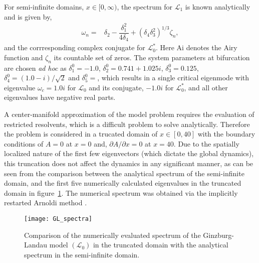 For semi-infinite domains, $x\in[0,\infty)$, the spectrum for $\mathcal{L}_{1}$ is known analytically \citep{chomaz88} and is given by,
	\begin{align}
		\omega_{n}	=& \delta_{2} - \dfrac{\delta_{1}^{2}}{4\delta_{4}} + (\delta_{4}\delta_{3}^{2})^{1/3}\zeta_{n}, \label{eqn:eigenvalues} 
	\end{align}
and the corrresponding complex conjugate for $\mathcal{L}^{*}_{0}$. Here $\mathrm{Ai}$ denotes the Airy function and $\zeta_{n}$ its countable set of zeros.
 The system parameters at bifurcation are chosen \emph{ad hoc} as $\delta^{0}_{1} = -1.0$, $\delta^{0}_{2} = 0.741 + 1.025i$, $\delta^{0}_{3}=0.125$, $\delta^{0}_{4}=(1.0 - i)/\sqrt{2}$ and $\delta^{0}_{5} = $, which results in a single critical eigenmode with eigenvalue $\omega_{c} = 1.0i$ for $\mathcal{L}_{0}$ and its conjugate, $-1.0i$ for $\mathcal{L}^{*}_{0}$, and all other eigenvalues have negative real parts. 
 
 A center-manifold approximation of the model problem requires the evaluation of restricted resolvents, which is a difficult problem to solve analytically. Therefore the problem is considered in a trucated domain of $x\in [0,40]$ with the boundary conditions of $A = 0$ at $x=0$ and, $\partial A/\partial x = 0$ at $x=40$. Due to the spatially localized nature of the first few eigenvectors (which dictate the global dynamics), this truncation does not affect the dynamics in any significant manner, as can be seen from the comparison between the analytical spectrum of the semi-infinite domain, and the first five numerically calculated eigenvalues in the truncated domain in figure~\ref{fig:GL_spectrum}. The numerical spectrum was obtained via the implicitly restarted Arnoldi method \citep{sorensen92}. 
\begin{figure}
	\centering
	\texttt{[image: GL\_spectra]}
	\caption{Comparison of the numerically evaluated spectrum of the Ginzburg-Landau model $(\mathcal{L}_{0})$ in the truncated domain with the analytical spectrum in the semi-infinite domain.}
	\label{fig:GL_spectrum}
\end{figure}

